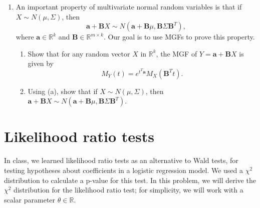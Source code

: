 \documentclass[11pt]{article}
\begin{document}
\begin{enumerate}
\item An important property of multivariate normal random variables is that if $X \sim N(\mu, \Sigma)$, then
$$\bm{a} + \bm{B} X \sim N(\bm{a} + \bm{B} \mu, \bm{B} \Sigma \bm{B}^T),$$
where $\bm{a} \in \mathbb{R}^k$ and $\bm{B} \in \mathbb{R}^{m \times k}$. Our goal is to use MGFs to prove this property.

\begin{enumerate}
\item Show that for any random vector $X$ in $\mathbb{R}^k$, the MGF of $Y = \bm{a} + \bm{B} X$ is given by
$$M_Y(t) = e^{t^T \bm{a}} M_X(\bm{B}^T t).$$

\item Using (a), show that if $X \sim N(\mu, \Sigma)$, then $\bm{a} + \bm{B} X \sim N(\bm{a} + \bm{B} \mu, \bm{B} \Sigma \bm{B}^T)$.
\end{enumerate}
\end{enumerate}

\section*{Likelihood ratio tests}

In class, we learned likelihood ratio tests as an alternative to Wald tests, for testing hypotheses about coefficients in a logistic regression model. We used a $\chi^2$ distribution to calculate a p-value for this test. In this problem, we will derive the $\chi^2$ distribution for the likelihood ratio test; for simplicity, we will work with a scalar parameter $\theta \in \mathbb{R}$.
\end{document}
